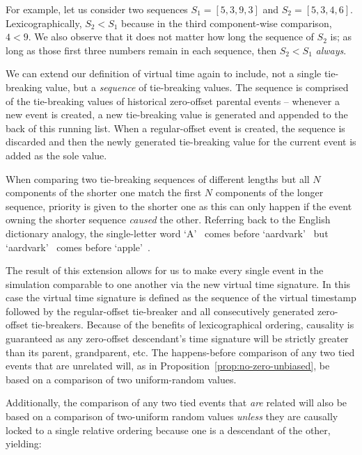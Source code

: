 \documentclass[nonacm,sigconf]{acmart}
\begin{document}
For example, let us consider two sequences $S_1 = [5,3,9,3]$ and $S_2 = [5,3,4,6]$. Lexicographically, $S_2 < S_1$ because in the third component-wise comparison, $4 < 9$. We also observe that it does not matter how long the sequence of $S_2$ is; as long as those first three numbers remain in each sequence, then $S_2 < S_1$ \emph{always}.

We can extend our definition of virtual time again to include, not a single tie-breaking value, but a \emph{sequence} of tie-breaking values. The sequence is comprised of the tie-breaking values of historical zero-offset parental events -- whenever a new event is created, a new tie-breaking value is generated and appended to the back of this running list. When a regular-offset event is created, the sequence is discarded and then the newly generated tie-breaking value for the current event is added as the sole value.

When comparing two tie-breaking sequences of different lengths but all $N$ components of the shorter one match the first $N$ components of the longer sequence, priority is given to the shorter one as this can only happen if the event owning the shorter sequence \emph{caused} the other. Referring back to the English dictionary analogy, the single-letter word \lq A\rq~ comes before \lq aardvark\rq~ but \lq aardvark\rq~ comes before \lq apple\rq~\cite{stevenson2010oxford}.

The result of this extension allows for us to make every single event in the simulation comparable to one another via the new virtual time signature. In this case the virtual time signature is defined as the sequence of the virtual timestamp followed by the regular-offset tie-breaker and all consecutively generated zero-offset tie-breakers. Because of the benefits of lexicographical ordering, causality is guaranteed as any zero-offset descendant's time signature will be strictly greater than its parent, grandparent, etc. The happens-before comparison of any two tied events that are unrelated will, as in Proposition~\ref{prop:no-zero-unbiased}, be based on a comparison of two uniform-random values.

Additionally, the comparison of any two tied events that \emph{are} related will also be based on a comparison of two-uniform random values \emph{unless} they are causally locked to a single relative ordering because one is a descendant of the other, yielding:
\end{document}
